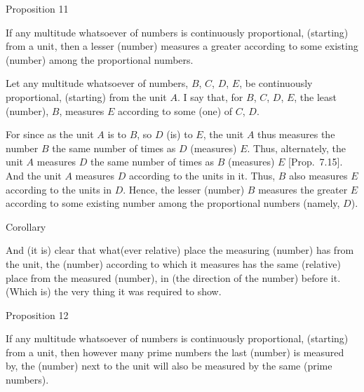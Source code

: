 
\begin{center}
{\large Proposition 11}
\end{center}

If any multitude whatsoever of numbers is continuously proportional, (starting) from a unit, then a lesser (number)
measures a greater according to some existing (number)  among
the proportional numbers.

\epsfysize=1.6in
\centerline{}

Let any multitude whatsoever of numbers,  $B$, $C$, $D$, $E$, be continuously proportional, (starting) from the unit $A$. I say that, for $B$, $C$, $D$, $E$, the least (number), $B$, measures $E$ according to some (one) of
$C$, $D$.

For since as the unit $A$ is to $B$, so $D$ (is) to $E$,  the unit $A$ thus measures the number $B$ the same number of times as $D$ (measures) $E$. Thus,
alternately, the unit $A$ measures $D$ the same number of times as $B$
(measures) $E$ [Prop.~7.15]. And the unit $A$ measures $D$ according to the units in it. Thus, $B$ also measures $E$ according to the units in $D$. Hence, the lesser (number) $B$
measures the greater $E$ according to some existing number among the
proportional numbers (namely, $D$). \\

\begin{center}
{\large Corollary}
\end{center}\vspace*{-7pt}

And (it is) clear that what(ever relative) place the measuring (number) has from the unit,
the  (number) according to which it measures has the same (relative) place from the measured (number), in (the direction of the number)
before it. (Which is) the very thing it was required to show.


\begin{center}
{\large Proposition 12}
\end{center}

If  any multitude whatsoever of numbers is continuously proportional, (starting) from a unit, then  however  many prime numbers  the
last (number) is measured by, the (number) next to the unit will also be measured by the same (prime numbers).

